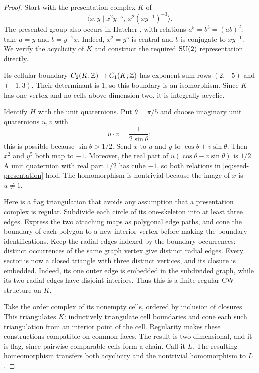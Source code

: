 \begin{proof}
Start with the presentation complex $K$ of
\begin{equation}\label{eq:seed-presentation}
 \langle x,y\mid x^2y^{-5},\ x^2(xy^{-1})^{-3}\rangle.
\end{equation}
The presented group also occurs in Hatcher
\cite[Example~2.38]{Hatcher2002}, with relations
$a^5=b^3=(ab)^2$: take $a=y$ and $b=y^{-1}x$.
Indeed, $x^2=y^5$ is central and $b$ is conjugate to $xy^{-1}$.
We verify the acyclicity of $K$ and construct the required
$\operatorname{SU}(2)$ representation directly.

Its cellular boundary $C_2(K;\mathbb Z)\to C_1(K;\mathbb Z)$ has exponent-sum
rows $(2,-5)$ and $(-1,3)$.  Their determinant is $1$, so this boundary
is an isomorphism.  Since $K$ has one vertex and no cells above
dimension two, it is integrally acyclic.

Identify $H$ with the unit quaternions.  Put $\theta=\pi/5$ and choose
imaginary unit quaternions $u,v$ with
\[
 u\mathbin{\cdot}v=\frac{1}{2\sin\theta};
\]
this is possible because $\sin\theta>1/2$.  Send $x$ to $u$ and $y$ to
$\cos\theta+v\sin\theta$.  Then $x^2$ and $y^5$ both map to $-1$.
Moreover, the real part of $u(\cos\theta-v\sin\theta)$ is $1/2$.
A unit quaternion with real part $1/2$ has cube $-1$, so both relations
in \eqref{eq:seed-presentation} hold.  The homomorphism is nontrivial
because the image of $x$ is $u\ne1$.

Here is a flag triangulation that avoids any assumption that a
presentation complex is regular.  Subdivide each circle of its
one-skeleton into at least three edges.  Express the two attaching
maps as polygonal edge paths, and cone the boundary of each polygon
to a new interior vertex before making the boundary identifications.
Keep the radial edges indexed by the boundary occurrences: distinct
occurrences of the same graph vertex give distinct radial edges.
Every sector is now a closed triangle with three distinct vertices,
and its closure is embedded.  Indeed, its one outer edge is embedded
in the subdivided graph, while its two radial edges have disjoint
interiors.  Thus this is a finite regular CW structure on $K$.

Take the order complex of its nonempty cells, ordered by inclusion of
closures.  This triangulates $K$: inductively triangulate cell
boundaries and cone each such triangulation from an interior point
of the cell.  Regularity makes these constructions compatible on
common faces.  The result is two-dimensional, and it is flag, since
pairwise comparable cells form a chain.  Call it $L$.  The resulting
homeomorphism transfers both acyclicity and the nontrivial
homomorphism to $L$.
\end{proof}

